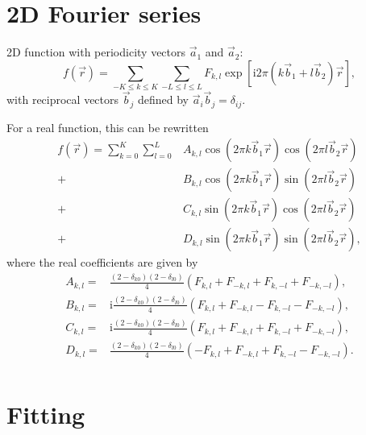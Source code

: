 \documentclass[a4paper]{article}
\newcommand{\mi}{\mathrm{i}}
\begin{document}
\section*{2D Fourier series}

2D function with periodicity vectors $\vec{a}_1$ and $\vec{a}_2$:
\begin{equation}
	f(\vec{r}) = \sum_{-K \leq k \leq K}{ \sum_{-L \leq l \leq L}{
		F_{k,l} \exp{\left[ \mi 2\pi \left( k\vec{b}_1 + l\vec{b}_2 \right)\vec{r}  \right] }
		}},
	\label{eq:TFcmplx}
\end{equation}
with reciprocal vectors $\vec{b}_j$ defined by $\vec{a}_i\vec{b}_j=\delta_{ij}$.

For a real function, this can be rewritten
\begin{equation}
	\begin{split}
	f(\vec{r}) = \sum_{k=0}^{K} \sum_{l=0}^{L}
	          & A_{k,l} \cos{\left( 2\pi k\vec{b}_1 \vec{r}\right)} \cos{\left( 2\pi l\vec{b}_2 \vec{r}\right)}  \\
		+ & B_{k,l} \cos{\left( 2\pi k\vec{b}_1 \vec{r}\right)} \sin{\left( 2\pi l\vec{b}_2 \vec{r}\right)}    \\
		+ & C_{k,l} \sin{\left( 2\pi k\vec{b}_1 \vec{r}\right)} \cos{\left( 2\pi l\vec{b}_2 \vec{r}\right)}    \\
		+ & D_{k,l} \sin{\left( 2\pi k\vec{b}_1 \vec{r}\right)} \sin{\left( 2\pi l\vec{b}_2 \vec{r}\right)},
	\end{split}
	\label{eq:TFreal}
\end{equation}
where the real coefficients are given by
\begin{align*}
	A_{k,l} =&     \frac{(2-\delta_{k0})(2-\delta_{l0})}{4} \left( F_{k,l} + F_{-k,l} + F_{k,-l} + F_{-k,-l} \right), \\
	B_{k,l} =& \mi \frac{(2-\delta_{k0})(2-\delta_{l0})}{4} \left( F_{k,l} + F_{-k,l} - F_{k,-l} - F_{-k,-l} \right), \\
	C_{k,l} =& \mi \frac{(2-\delta_{k0})(2-\delta_{l0})}{4} \left( F_{k,l} + F_{-k,l} + F_{k,-l} + F_{-k,-l} \right), \\
	D_{k,l} =&     \frac{(2-\delta_{k0})(2-\delta_{l0})}{4} \left( - F_{k,l} + F_{-k,l} + F_{k,-l} - F_{-k,-l} \right). \\
\end{align*}

\section*{Fitting}
\end{document}
